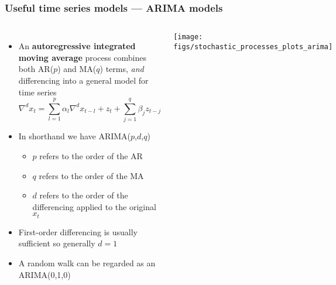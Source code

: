 \documentclass{beamer}
\begin{document}
\begin{frame}
    \frametitle{Useful time series models --- ARIMA models}
    \small
    \begin{columns}
    \column{7cm}
        \begin{itemize}
            \item An \textbf{autoregressive integrated moving average} process combines both AR($p$) and MA($q$) terms, \textit{and} differencing into a general model for time series
            $$\nabla^d x_t = \sum \limits_{l = 1}^p \alpha_l \nabla^d x_{t-l} + z_t + \sum \limits_{j = 1}^q \beta_j z_{t-j}$$
            \item In shorthand we have ARIMA($p$,$d$,$q$)
            \begin{itemize}
                \item $p$ refers to the order of the AR
                \item $q$ refers to the order of the MA
                \item $d$ refers to the order of the differencing applied to the original $x_t$
            \end{itemize}
            \item First-order differencing is usually sufficient so generally $d = 1$
            \item A random walk can be regarded as an ARIMA(0,1,0)
        \end{itemize}
    \column{5cm}
    \texttt{[image: figs/stochastic\_processes\_plots\_arima]}
    \end{columns}
    \normalsize
\end{frame}
\end{document}
